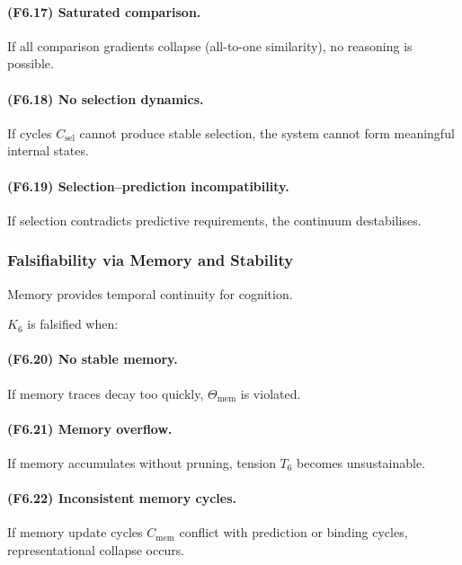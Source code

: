 \paragraph{(F6.17) Saturated comparison.}
If all comparison gradients collapse (all-to-one similarity),
no reasoning is possible.

\paragraph{(F6.18) No selection dynamics.}
If cycles $C_{\mathrm{sel}}$ cannot produce stable selection,
the system cannot form meaningful internal states.

\paragraph{(F6.19) Selection–prediction incompatibility.}
If selection contradicts predictive requirements,
the continuum destabilises.



\subsubsection{Falsifiability via Memory and Stability}

Memory provides temporal continuity for cognition.

$K_6$ is falsified when:

\paragraph{(F6.20) No stable memory.}
If memory traces decay too quickly,
$\Theta_{\mathrm{mem}}$ is violated.

\paragraph{(F6.21) Memory overflow.}
If memory accumulates without pruning,
tension $T_6$ becomes unsustainable.

\paragraph{(F6.22) Inconsistent memory cycles.}
If memory update cycles $C_{\mathrm{mem}}$ conflict with
prediction or binding cycles, representational collapse occurs.

